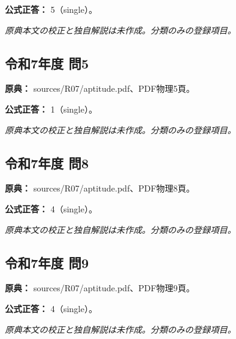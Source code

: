 \textbf{公式正答：} 5（single）。

\par\textit{原典本文の校正と独自解説は未作成。分類のみの登録項目。}

\subsection{令和7年度 問5}
\label{q:r07-reg-apt-05}

\noindent\textbf{原典：} sources/R07/aptitude.pdf、PDF物理5頁。

\textbf{公式正答：} 1（single）。

\par\textit{原典本文の校正と独自解説は未作成。分類のみの登録項目。}

\subsection{令和7年度 問8}
\label{q:r07-reg-apt-08}

\noindent\textbf{原典：} sources/R07/aptitude.pdf、PDF物理8頁。

\textbf{公式正答：} 4（single）。

\par\textit{原典本文の校正と独自解説は未作成。分類のみの登録項目。}

\subsection{令和7年度 問9}
\label{q:r07-reg-apt-09}

\noindent\textbf{原典：} sources/R07/aptitude.pdf、PDF物理9頁。

\textbf{公式正答：} 4（single）。

\par\textit{原典本文の校正と独自解説は未作成。分類のみの登録項目。}

